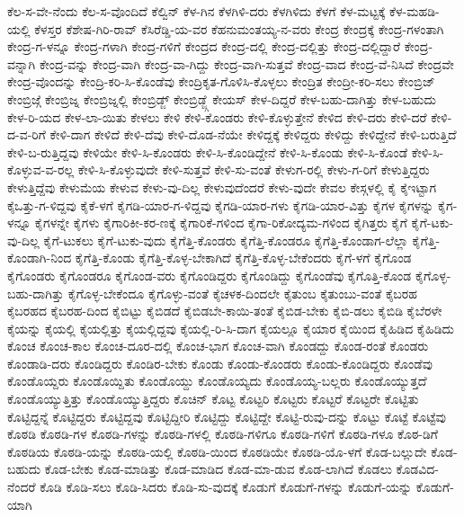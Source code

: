 {ಕೆಲ-ಸ-ವೇ-ನೆಂದು
ಕೆಲ-ಸ-ವೊಂದಿದೆ
ಕೆಲ್ವಿನ್
ಕೆಳ-ಗಿನ
ಕೆಳಗಿಳಿ-ದರು
ಕೆಳಗಿಳಿದು
ಕೆಳಗೆ
ಕೆಳ-ಮಟ್ಟಕ್ಕೆ
ಕೆಳ-ಮಹಡಿ-ಯಲ್ಲಿ
ಕೆಳಸ್ತರ
ಕೆಶೇಷ-ಗಿರಿ-ರಾವ್
ಕೆಸಿರೆಡ್ಡಿ-ಯ-ವರ
ಕೆಹನುಮಂತಯ್ಯ-ನ-ವರು
ಕೇಂದ್ರ
ಕೇಂದ್ರಕ್ಕೆ
ಕೇಂದ್ರ-ಗಳಂತಾಗಿ
ಕೇಂದ್ರ-ಗ-ಳನ್ನೂ
ಕೇಂದ್ರ-ಗಳಾಗಿ
ಕೇಂದ್ರ-ಗಳಿಗೆ
ಕೇಂದ್ರದ
ಕೇಂದ್ರ-ದಲ್ಲಿ
ಕೇಂದ್ರ-ದಲ್ಲಿತ್ತು
ಕೇಂದ್ರ-ದಲ್ಲಿದ್ದಾರೆ
ಕೇಂದ್ರ-ವನ್ನಾಗಿ
ಕೇಂದ್ರ-ವನ್ನು
ಕೇಂದ್ರ-ವಾಗಿ
ಕೇಂದ್ರ-ವಾ-ಗಿದ್ದು
ಕೇಂದ್ರ-ವಾಗಿ-ಸುತ್ತವೆ
ಕೇಂದ್ರ-ವಾದ
ಕೇಂದ್ರ-ವೆ-ನಿಸಿದೆ
ಕೇಂದ್ರವೇ
ಕೇಂದ್ರ-ವೊಂದನ್ನು
ಕೇಂದ್ರಿ-ಕರಿ-ಸಿ-ಕೊಂಡೆವು
ಕೇಂದ್ರಿಕೃತ-ಗೊಳಿಸಿ-ಕೊಳ್ಳಲು
ಕೇಂದ್ರಿತ
ಕೇಂದ್ರೀ-ಕರಿ-ಸಲು
ಕೇಂಬ್ರಿಜ್
ಕೇಂಬ್ರಿಜ್ಗೆ
ಕೇಂಬ್ರಿಜ್ನ
ಕೇಂಬ್ರಿಜ್ನಲ್ಲಿ
ಕೇಂಬ್ರಿಡ್ಜ್
ಕೇಂಬ್ರಿಡ್ಜ್ಗೆ
ಕೇಯಸ್
ಕೇಳ-ದಿದ್ದರೆ
ಕೇಳ-ಬಹು-ದಾಗಿತ್ತು
ಕೇಳ-ಬಹುದು
ಕೇಳ-ರಿ-ಯದ
ಕೇಳ-ಲಾ-ಯಿತು
ಕೇಳಲು
ಕೇಳಿ
ಕೇಳಿ-ಕೊಂಡರು
ಕೇಳಿ-ಕೊಳ್ಳುತ್ತೇನೆ
ಕೇಳಿದ
ಕೇಳಿ-ದರು
ಕೇಳಿ-ದರೆ
ಕೇಳಿ-ದ-ವ-ರಿಗೆ
ಕೇಳಿ-ದಾಗ
ಕೇಳಿದೆ
ಕೇಳಿ-ದೆವು
ಕೇಳಿ-ದೊಡ-ನೆಯೇ
ಕೇಳಿದ್ದಕ್ಕೆ
ಕೇಳಿದ್ದರು
ಕೇಳಿದ್ದು
ಕೇಳಿದ್ದೇನೆ
ಕೇಳಿ-ಬರುತ್ತಿದೆ
ಕೇಳಿ-ಬ-ರುತ್ತಿದ್ದವು
ಕೇಳಿಯೇ
ಕೇಳಿ-ಸಿ-ಕೊಂಡರು
ಕೇಳಿ-ಸಿ-ಕೊಂಡಿದ್ದೇನೆ
ಕೇಳಿ-ಸಿ-ಕೊಂಡು
ಕೇಳಿ-ಸಿ-ಕೊಂಡೆ
ಕೇಳಿ-ಸಿ-ಕೊಳ್ಳುವ-ವ-ರಲ್ಲ
ಕೇಳಿ-ಸಿ-ಕೊಳ್ಳುವುದೇ
ಕೇಳಿ-ಸುತ್ತವೆ
ಕೇಳಿ-ಸು-ವಂತೆ
ಕೇಳುಗ-ರಲ್ಲಿ
ಕೇಳು-ಗ-ರಿಗೆ
ಕೇಳುತ್ತಿದ್ದರು
ಕೇಳುತ್ತಿದ್ದೆವು
ಕೇಳುಮೆಯ
ಕೇಳುವ
ಕೇಳು-ವು-ದಿಲ್ಲ
ಕೇಳುವುದೆಂದರೆ
ಕೇಳು-ವುದೇ
ಕೇವಲ
ಕೇಸ್ಗಳಲ್ಲಿ
ಕೈ
ಕೈಇಟ್ಟಾಗ
ಕೈಒತ್ತು-ಗ-ಳಿದ್ದವು
ಕೈಕೆ-ಳಗೆ
ಕೈಗಡಿ-ಯಾರ-ಗ-ಳಿದ್ದವು
ಕೈಗಡಿ-ಯಾರ-ಗಳು
ಕೈಗಡಿ-ಯಾರ-ವಿತ್ತು
ಕೈಗಳ
ಕೈಗಳನ್ನು
ಕೈಗ-ಳನ್ನೂ
ಕೈಗಳನ್ನೇ
ಕೈಗಳು
ಕೈಗಾರಿಕೀ-ಕರ-ಣಕ್ಕೆ
ಕೈಗಾರಿಕೆ-ಗಳಿಂದ
ಕೈಗಾ-ರಿಕೋದ್ಯಮ-ಗಳಿಂದ
ಕೈಗಿತ್ತರು
ಕೈಗೆ
ಕೈಗೆ-ಟಕು-ವು-ದಿಲ್ಲ
ಕೈಗೆ-ಟುಕಲು
ಕೈಗೆ-ಟುಕು-ವುದು
ಕೈಗೆತ್ತಿ-ಕೊಂಡರು
ಕೈಗೆತ್ತಿ-ಕೊಂಡರೂ
ಕೈಗೆತ್ತಿ-ಕೊಂಡಾಗ-ಲೆಲ್ಲಾ
ಕೈಗೆತ್ತಿ-ಕೊಂಡಾಗಿ-ನಿಂದ
ಕೈಗೆತ್ತಿ-ಕೊಂಡು
ಕೈಗೆತ್ತಿ-ಕೊಳ್ಳ-ಬೇಕಾಗಿದೆ
ಕೈಗೆತ್ತಿ-ಕೊಳ್ಳ-ಬೇಕೆಂದರು
ಕೈಗೆ-ಳಗೆ
ಕೈಗೊಂಡ
ಕೈಗೊಂಡರು
ಕೈಗೊಂಡರೂ
ಕೈಗೊಂಡ-ವರು
ಕೈಗೊಂಡಿದ್ದರು
ಕೈಗೊಂಡಿದ್ದು
ಕೈಗೊಂಡೆವು
ಕೈಗೊತ್ತಿ-ಕೊಂಡ
ಕೈಗೊಳ್ಳ-ಬಹು-ದಾಗಿತ್ತು
ಕೈಗೊಳ್ಳ-ಬೇಕೆಂದೂ
ಕೈಗೊಳ್ಳು-ವಂತೆ
ಕೈಚಳಕ-ದಿಂದಲೇ
ಕೈತುಂಬ
ಕೈತುಂಬು-ವಂತೆ
ಕೈಬರಹ
ಕೈಬರಹದ
ಕೈಬರಹ-ದಿಂದ
ಕೈಬಿಟ್ಟು
ಕೈಬಿಡದೆ
ಕೈಬಿಡಬೇ-ಕಾಯಿ-ತಂತೆ
ಕೈಬಿಡ-ಬೇಕು
ಕೈಬಿ-ಡಲು
ಕೈಬಿಡಿ
ಕೈಬೆರಳೇ
ಕೈಯನ್ನು
ಕೈಯಲ್ಲಿ
ಕೈಯಲ್ಲಿತ್ತು
ಕೈಯಲ್ಲಿದ್ದವು
ಕೈಯಲ್ಲಿ-ರಿ-ಸಿ-ದಾಗ
ಕೈಯಲ್ಲೂ
ಕೈಯಾರ
ಕೈಯಿಂದ
ಕೈಹಿಡಿದ
ಕೈಹಿಡಿದು
ಕೊಂಚ
ಕೊಂಚ-ಕಾಲ
ಕೊಂಚ-ದೂರ-ದಲ್ಲಿ
ಕೊಂಚ-ಭಾಗ
ಕೊಂಚ-ವಾಗಿ
ಕೊಂಡದ್ದು
ಕೊಂಡ-ರಂತೆ
ಕೊಂಡರು
ಕೊಂಡಾಡಿ-ದರು
ಕೊಂಡಿದ್ದರು
ಕೊಂಡಿರ-ಬೇಕು
ಕೊಂಡು
ಕೊಂಡು-ಕೊಂಡರು
ಕೊಂಡು-ಕೊಂಡಿದ್ದರು
ಕೊಂಡೆವು
ಕೊಂಡೊಯ್ದರು
ಕೊಂಡೊಯ್ದಿತು
ಕೊಂಡೊಯ್ದು
ಕೊಂಡೊಯ್ಯದು
ಕೊಂಡೊಯ್ಯ-ಬಲ್ಲರು
ಕೊಂಡೊಯ್ಯುತ್ತದೆ
ಕೊಂಡೊಯ್ಯುತ್ತಿತ್ತು
ಕೊಂಡೊಯ್ಯುತ್ತಿದ್ದರು
ಕೊಚಿನ್
ಕೊಟ್ಟ
ಕೊಟ್ಟರಿ
ಕೊಟ್ಟರು
ಕೊಟ್ಟರೆ
ಕೊಟ್ಟರೇ
ಕೊಟ್ಟಿತು
ಕೊಟ್ಟಿದ್ದನ್ನೆ
ಕೊಟ್ಟಿದ್ದರು
ಕೊಟ್ಟಿದ್ದವು
ಕೊಟ್ಟಿದ್ದೀರಿ
ಕೊಟ್ಟಿದ್ದು
ಕೊಟ್ಟಿದ್ದೇ
ಕೊಟ್ಟಿ-ರುವು-ದನ್ನು
ಕೊಟ್ಟು
ಕೊಟ್ಟೆ
ಕೊಟ್ಟೆವು
ಕೊಠಡಿ
ಕೊಠಡಿ-ಗಳ
ಕೊಠಡಿ-ಗಳನ್ನು
ಕೊಠಡಿ-ಗಳಲ್ಲಿ
ಕೊಠಡಿ-ಗಳಿಗೂ
ಕೊಠಡಿ-ಗಳಿಗೆ
ಕೊಠಡಿ-ಗಳೂ
ಕೊಠ-ಡಿಗೆ
ಕೊಠಡಿಯ
ಕೊಠಡಿ-ಯನ್ನು
ಕೊಠಡಿ-ಯಲ್ಲಿ
ಕೊಠಡಿ-ಯಿಂದ
ಕೊಠಡಿಯೇ
ಕೊಠಡಿ-ಯೊ-ಳಗೆ
ಕೊಡ-ಬಲ್ಲುದೇ
ಕೊಡ-ಬಹುದು
ಕೊಡ-ಬೇಕು
ಕೊಡ-ಮಾಡಿತ್ತು
ಕೊಡ-ಮಾಡಿದ
ಕೊಡ-ಮಾ-ಡುವ
ಕೊಡ-ಲಾಗಿದೆ
ಕೊಡಲು
ಕೊಡವಿದ-ನೆಂದರೆ
ಕೊಡಿ
ಕೊಡಿ-ಸಲು
ಕೊಡಿ-ಸಿದರು
ಕೊಡಿ-ಸು-ವುದಕ್ಕೆ
ಕೊಡುಗೆ
ಕೊಡುಗೆ-ಗಳನ್ನು
ಕೊಡುಗೆ-ಯನ್ನು
ಕೊಡುಗೆ-ಯಾಗಿ
}

